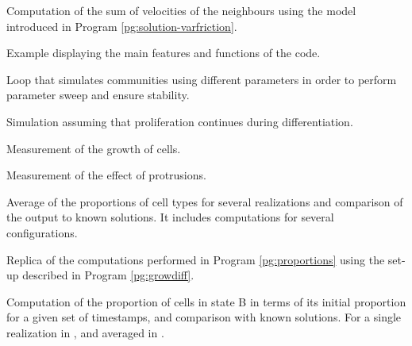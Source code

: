 \begin{program}[\code{3.07}]\label{pg:vsum-zero}
    Computation of the sum of velocities of the neighbours using the model introduced in Program \ref{pg:solution-varfriction}.
\end{program}

\begin{program}[\code{4.00}]\label{pg:example-code}
    Example displaying the main features and functions of the code.
\end{program}

\begin{program}[\code{4.01}]\label{pg:formed-correctly}
    Loop that simulates communities using different parameters in order to perform parameter sweep and ensure stability.
\end{program}

\begin{program}[\code{4.02}]\label{pg:growdiff}
    Simulation assuming that proliferation continues during differentiation.
\end{program}

\begin{program}[\code{4.03}]\label{pg:measure-growth}
    Measurement of the growth of cells.
\end{program}

\begin{program}[\code{4.04}]\label{pg:measure-protrusions}
    Measurement of the effect of protrusions.
\end{program}

\begin{program}[\code{4.05}]\label{pg:proportions}
    Average of the proportions of cell types for several realizations and comparison of the output to known solutions. It includes computations for several configurations.
\end{program}

\begin{program}[\code{4.06}]\label{pg:growdiff-proportions}
    Replica of the computations performed in Program \ref{pg:proportions} using the set-up described in Program \ref{pg:growdiff}.
\end{program}

\begin{program}\label{pg:phib}
    Computation of the proportion of cells in state B in terms of its initial proportion for a given set of timestamps, and comparison with known solutions. For a single realization in , and averaged in .
\end{program}

